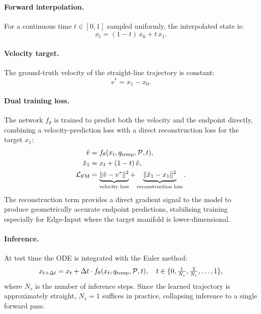 \documentclass{article}
\begin{document}
\paragraph{Forward interpolation.} For a continuous time $t \in [0, 1]$ sampled uniformly, the interpolated state is:
\begin{equation}
    x_t = (1 - t)\,x_0 + t\,x_1.
    \label{eq:interpolation}
\end{equation}

\paragraph{Velocity target.} The ground-truth velocity of the straight-line trajectory is constant:
\begin{equation}
    v^* = x_1 - x_0.
    \label{eq:velocity}
\end{equation}

\paragraph{Dual training loss.} The network $f_\theta$ is trained to predict both the velocity and the endpoint directly, combining a velocity-prediction loss with a direct reconstruction loss for the target $x_1$:
\begin{align}
    \hat{v} &= f_\theta(x_t, q_\mathrm{temp}, \mathcal{P}, t), \label{eq:vpred}\\
    \hat{x}_1 &= x_t + (1 - t)\,\hat{v}, \label{eq:x1pred}\\
    \mathcal{L}_\text{FM} &= \underbrace{\|\hat{v} - v^*\|^2}_{\text{velocity loss}} + \underbrace{\|\hat{x}_1 - x_1\|^2}_{\text{reconstruction loss}}.
    \label{eq:fm_loss}
\end{align}
The reconstruction term provides a direct gradient signal to the model to produce geometrically accurate endpoint predictions, stabilising training especially for Edge-Input where the target manifold is lower-dimensional.

\paragraph{Inference.} At test time the ODE is integrated with the Euler method:
\begin{equation}
    x_{t + \Delta t} = x_t + \Delta t \cdot f_\theta(x_t, q_\mathrm{temp}, \mathcal{P}, t), \quad t \in \{0, \tfrac{1}{N_s}, \tfrac{2}{N_s}, \ldots, 1\},
    \label{eq:euler}
\end{equation}
where $N_s$ is the number of inference steps. Since the learned trajectory is approximately straight, $N_s = 1$ suffices in practice, collapsing inference to a single forward pass.
\end{document}
